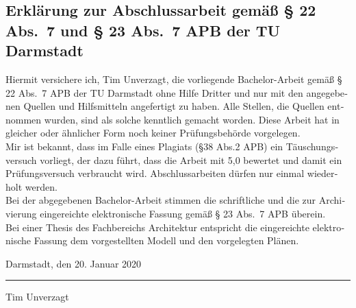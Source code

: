 \documentclass[longdoc,accentcolor=tud1b,11pt,paper=a4]{tudreport}
\title{\komTitle}
\subtitle{\komTitleTranslation \\ \komThesisType}
\newcommand{\komThesisType}{Bachelor-Arbeit\xspace}
\newcommand{\komName}{Tim Unverzagt\xspace}
\newcommand{\komSubmissionDate}{20. Januar 2020\xspace}%
\begin{document}
	
	\frenchspacing
	\raggedbottom
	\maketitle
	

    \begin{otherlanguage}{ngerman}
    \chapter*{Erklärung zur Abschlussarbeit gemäß § 22 Abs.\ 7 und § 23 Abs.\ 7 APB der TU Darmstadt}
    Hiermit versichere ich, \komName, die vorliegende \komThesisType gemäß § 22 Abs.\ 7 APB der TU Darmstadt ohne Hilfe Dritter und nur mit den angegebenen Quellen und Hilfsmitteln angefertigt zu haben. 
    Alle Stellen, die Quellen entnommen wurden, sind als solche kenntlich gemacht worden. 
    Diese Arbeit hat in gleicher oder ähnlicher Form noch keiner Prüfungsbehörde vorgelegen.\\

    \noindent Mir ist bekannt, dass im Falle eines Plagiats (§38 Abs.2 APB) ein Täuschungsversuch vorliegt, der dazu führt, dass die Arbeit mit 5,0 bewertet und damit ein Prüfungsversuch verbraucht wird. 
    Abschlussarbeiten dürfen nur einmal wiederholt werden.\\

    \noindent Bei der abgegebenen \komThesisType stimmen die schriftliche und die zur Archivierung eingereichte elektronische Fassung gemäß § 23 Abs.\ 7 APB überein. \\
    
    \noindent Bei einer Thesis des Fachbereichs Architektur entspricht die eingereichte elektronische Fassung dem vorgestellten Modell und den vorgelegten Plänen.
    
    \vspace{4em}
    
    \noindent Darmstadt, den \komSubmissionDate 
    
    \vspace{3em}
    
    \noindent\rule{5cm}{0.4pt}
    
    \noindent\komName
    
    \end{otherlanguage}
    
\end{document}
